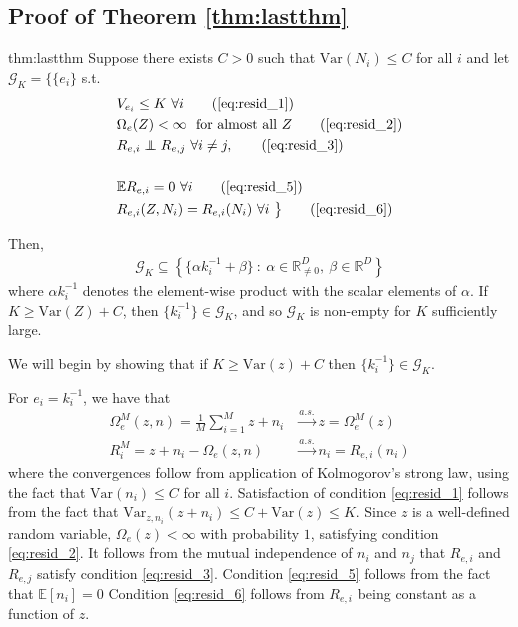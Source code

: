 \subsection{Proof of Theorem \ref{thm:lastthm}}
\label{sec:lasttmpr}


\begin{reptheorem}{thm:lastthm}
	Suppose there exists $C>0$ such that $\text{Var}(N_i) \leq C$ for all $i$ and let $\mathcal{G}_K = \big\lbrace
	\{{e}_i \}$ s.t.
	\begin{align}
	& V_{{e}_i} \leq K \ \forall i \tag{\ref{eq:resid_1}}\\
	& \Omega_{{e}}(Z) < \infty \  \text{ for almost all } Z \tag{\ref{eq:resid_2}}\\
	&R_{{e}, i} \independent R_{{e}, j} \ \forall i \not= j, \tag{\ref{eq:resid_3}}\\
	\nonumber \\    &\mathbb{E} R_{{e}, i} = 0 \ \forall i \tag{\ref{eq:resid_5}} \\
	&R_{{e}, i}(Z, N_i) = R_{{e}, i}(N_i) \ \forall i \ \big\rbrace \tag{\ref{eq:resid_6}}
	\end{align}
	
	Then,
	\begin{align*}
	\mathcal{G}_K \subseteq\left\lbrace \{ {\alpha} {k}^{-1}_i + {\beta} \} \ : \ {\alpha} \in \mathbb{R}^{D}_{\not=0}, \: {\beta} \in \mathbb{R}^{D} \right\rbrace
	\end{align*}
	where $\alpha {k}^{-1}_i$ denotes the element-wise product with the scalar elements of ${\alpha}$.
	If $K \geq \text{Var}(Z) + C$, then $ \{ {k}^{-1}_i \}  \in \mathcal{G}_K$,
	and so $\mathcal{G}_K$ is non-empty for $K$ sufficiently large.
\end{reptheorem}

We will begin by showing that if $K \geq \mathrm{Var}({z}) + C$ then $\{ {k}^{-1}_i \}  \in \mathcal{G}_K$.

For ${e}_i = {k}_i^{-1}$, we have that
\begin{align*}
\Omega_{{e}}^M({z}, {n}) = \frac{1}{M} \sum_{i=1}^M {z} + {n}_i &\overset{a.s.}{\longrightarrow} {z} = \Omega_{{e}}^M({z})\\
R_i^M = {z} + {n}_i - \Omega_{{e}}({z}, {n})  &\overset{a.s.}{\longrightarrow} {n}_i = R_{{e}, i}({n}_i)
\end{align*}
where the convergences follow from application of Kolmogorov's strong law, using the fact that $\mathrm{Var}({n}_i) \leq C$ for all $i$.
Satisfaction of condition \ref{eq:resid_1} follows from the fact that $\mathrm{Var}_{{z}, {n}_i} ({z} + {n}_i) \leq C + \mathrm{Var}({z}) \leq K$.
Since ${z}$ is a well-defined random variable,  $\Omega_{{e}}({z}) < \infty$ with probability $1$, satisfying condition \ref{eq:resid_2}.
It follows from the mutual independence of ${n}_i$ and ${n}_j$ that $R_{{e}, i}$ and $R_{{e}, j}$ satisfy condition \ref{eq:resid_3}.
Condition \ref{eq:resid_5} follows from the fact that $\mathbb{E}[{n}_i]=0$
Condition \ref{eq:resid_6} follows from $R_{{e}, i}$ being constant as a function of ${z}$.

